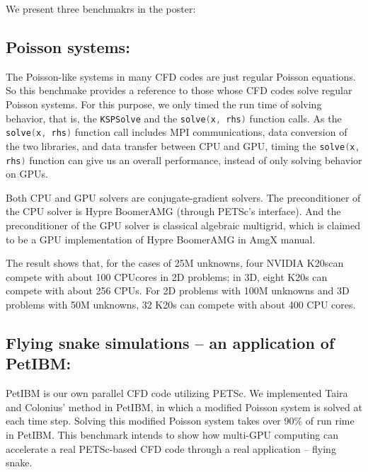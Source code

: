We present three benchmakrs in the poster:

\subsection{Poisson systems:}

    The Poisson-like systems in many CFD codes are just regular Poisson equations.
    So this benchmake provides a reference to those 
    whose CFD codes solve regular Poisson systems.
    For this purpose,
    we only timed the run time of solving behavior, that is, the
    \lstinline[language=C++, basicstyle=\ttfamily]|KSPSolve| and the
    \lstinline[language=C++, basicstyle=\ttfamily]|solve(x, rhs)| function calls.
    As the
    \lstinline[language=C++, basicstyle=\ttfamily]|solve(x, rhs)| function call
    includes MPI communications, 
    data conversion of the two libraries, 
    and data transfer between CPU and GPU,
    timing the
    \lstinline[language=C++, basicstyle=\ttfamily]|solve(x, rhs)| function
    can give us an overall performance, 
    instead of only solving behavior on GPUs.

    Both CPU and GPU solvers are conjugate-gradient solvers.
    The preconditioner of the CPU solver is Hypre BoomerAMG (through PETSc's interface).
    And the preconditioner of the GPU solver is classical algebraic multigrid, 
    which is claimed to be a GPU implementation of Hypre BoomerAMG in AmgX manual.

    The result shows that, for the cases of 25M unknowns,
    four NVIDIA K20s\footnotemark[2] can compete with about 100 CPU\footnotemark[3] cores in 2D problems;
    in 3D, eight K20s can compete with about 256 CPUs.
    For 2D problems with 100M unknowns and 3D problems with 50M unknowns,
    32 K20s can compete with about 400 CPU cores.

\subsection{Flying snake simulations -- an application of PetIBM:}

    PetIBM is our own parallel CFD code utilizing PETSc. 
    We implemented Taira and Colonius' method in PetIBM, 
    in which a modified Poisson system is solved at each time step.
    Solving this modified Poisson system takes over 90\% of run rime in PetIBM.
    This benchmark intends to show how multi-GPU computing can accelerate
    a real PETSc-based CFD code through a real application -- flying snake.

